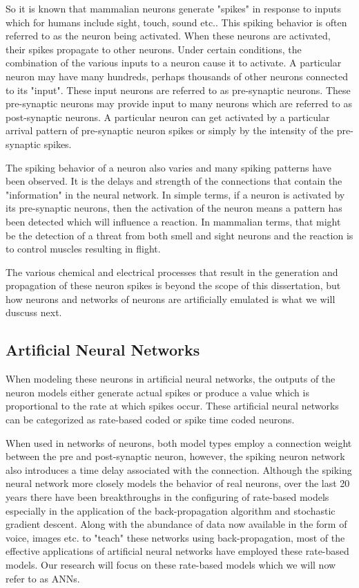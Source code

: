 \iftrue
So it is known that mammalian neurons generate "spikes" in response to inputs which for humans include sight, touch, sound etc.. This spiking behavior is often referred to as the neuron being activated.
When these neurons are activated, their spikes propagate to other neurons. Under certain conditions, the combination of the various inputs to a neuron cause it to activate. 
A particular neuron may have many hundreds, perhaps thousands of other neurons connected to its "input".
These input neurons are referred to as pre-synaptic neurons. These pre-synaptic neurons may provide input to many neurons which are referred to as post-synaptic neurons.
A particular neuron can get activated by a particular arrival pattern of pre-synaptic neuron spikes or simply by the intensity of the pre-synaptic spikes. 

The spiking behavior of a neuron also varies and many spiking patterns have been observed. 
It is the delays and strength of the connections that contain the "information" in the neural network.
In simple terms, if a neuron is activated by its pre-synaptic neurons, then the activation of the neuron means a pattern has been detected which will influence a reaction.
In mammalian terms, that might be the detection of a threat from both smell and sight neurons and the reaction is to control muscles resulting in flight.

The various chemical and electrical processes that result in the generation and propagation of these neuron spikes is beyond the scope of this dissertation, but how neurons and networks of neurons are artificially emulated is what we will duscuss next.


\subsection*{Artificial Neural Networks}
\label{sec:Artificial Neural Networks}

When modeling these neurons in artificial neural networks, the outputs of the neuron models either generate actual spikes or
produce a value which is proportional to the rate at which spikes occur.
These artificial neural networks can be categorized as rate-based coded or spike time coded neurons.

When used in networks of neurons, both model types employ a connection weight between the pre and post-synaptic neuron, however, the
spiking neuron network also introduces a time delay associated with the connection.
Although the spiking neural network more closely models the behavior of real neurons, over the last 20 years there 
have been breakthroughs in the configuring of rate-based models especially in the application of the back-propagation
algorithm and stochastic gradient descent. Along with the abundance of data now available in the form of voice, images etc. to "teach" these networks
using back-propagation, most of the effective applications of artificial neural networks have employed these rate-based models.
Our research will focus on these rate-based models which we will now refer to as ANNs.
\fi

